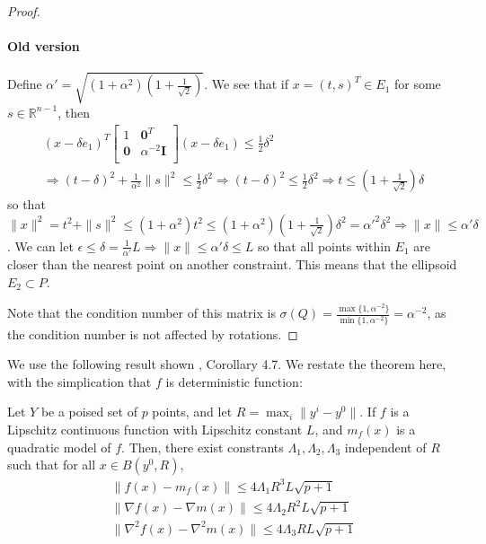 \begin{proof}
\paragraph{Old version}
Define $\alpha' = \sqrt{\left(1 + \alpha^2 \right) \left(1 + \frac 1 {\sqrt{2}}\right)}$.
We see that if $x = (t, s)^T \in E_1$ for some $s \in \mathbb R^{n-1}$, then
\begin{align*}
(x - \delta e_1)^T\begin{bmatrix}
1 & \boldsymbol0^T \\
\boldsymbol 0 & \alpha^{-2} \boldsymbol I \\
\end{bmatrix}(x - \delta e_1) \le \frac 1 2 \delta^2 \\
\Longrightarrow (t - \delta)^2 + \frac {1} {\alpha^2} \|s\|^2 \le \frac 1 2 \delta^2
\Longrightarrow (t - \delta)^2 \le \frac 1 2 \delta^2
\Longrightarrow t \le \left(1 + \frac 1 {\sqrt{2}}\right) \delta
\end{align*}
so that $\|x\|^2 = t^2 + \|s\|^2 \le \left(1 + \alpha^2 \right) t^2 \le \left(1 + \alpha^2 \right) \left(1 + \frac 1 {\sqrt{2}}\right) \delta^2 = {\alpha'}^2 \delta^2 \Longrightarrow \|x\| \le \alpha' \delta$.
We can let $\epsilon \le \delta = \frac 1 {\alpha'} L \Longrightarrow \|x\| \le \alpha' \delta \le L$ so that all points within $E_1$ are closer than the nearest point on another constraint.
This means that the ellipsoid $E_2 \subset P$.

Note that the condition number of this matrix is $\sigma(Q) = \frac{\max\{1, \alpha^{-2}\}}{\min\{1, \alpha^{-2}\}} = \alpha^{-2}$,
as the condition number is not affected by rotations.
\end{proof}

We use the following result shown \cite{Billups_Larson_2013}, Corollary 4.7.
We restate the theorem here, with the simplication that $f$ is deterministic function:
\begin{lemma}
\label{change_radius}
Let $Y$ be a poised set of $p$ points, and let $R = \max_{i}\|y^i - y^0\|$.
If $f$ is a Lipschitz continuous function with Lipschitz constant $L$, and $m_f(x)$ is a quadratic model of $f$.
Then, there exist constrants $\Lambda_1, \Lambda_2, \Lambda_3$ independent of $R$ such that for all $x \in B(y^0, R)$,
\begin{align*}
\|f(x) - m_f(x)\| \le 4\Lambda_1 R^3L \sqrt{p+1} \\
\|\nabla f(x) - \nabla m(x)\| \le 4\Lambda_2R^2  L \sqrt{p+1} \\
\|\nabla^2 f(x) - \nabla^2 m(x)\| \le 4\Lambda_3  RL \sqrt{p+1}
\end{align*}
\end{lemma}





